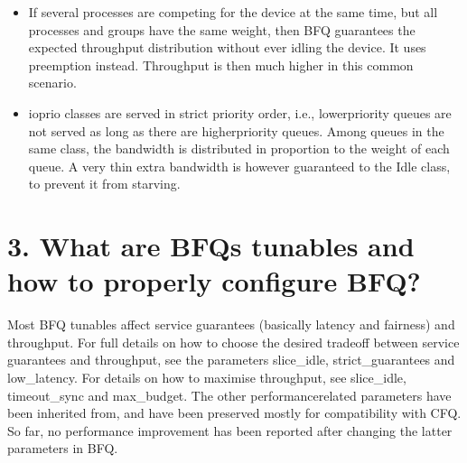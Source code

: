 \documentclass[a4paper,11pt,english]{sphinxmanual}
\begin{document}
\begin{itemize}
\begin{itemize}
\begin{itemize}
\begin{itemize}
\item {} 
Let small budgets be eventually assigned to the queues
associated with time\sphinxhyphen{}sensitive applications (which typically
perform sporadic and short I/O), because, the smaller the
budget assigned to a queue waiting for service is, the sooner
B\sphinxhyphen{}WF2Q+ will serve that queue (Subsec 3.3 in {[}2{]}).

\end{itemize}

\end{itemize}

\end{itemize}

\item {} 
If several processes are competing for the device at the same time,
but all processes and groups have the same weight, then BFQ
guarantees the expected throughput distribution without ever idling
the device. It uses preemption instead. Throughput is then much
higher in this common scenario.

\item {} 
ioprio classes are served in strict priority order, i.e.,
lower\sphinxhyphen{}priority queues are not served as long as there are
higher\sphinxhyphen{}priority queues.  Among queues in the same class, the
bandwidth is distributed in proportion to the weight of each
queue. A very thin extra bandwidth is however guaranteed to
the Idle class, to prevent it from starving.

\end{itemize}


\section{3. What are BFQ\textquotesingle{}s tunables and how to properly configure BFQ?}
\label{\detokenize{bfq-iosched:what-are-bfq-s-tunables-and-how-to-properly-configure-bfq}}
Most BFQ tunables affect service guarantees (basically latency and
fairness) and throughput. For full details on how to choose the
desired tradeoff between service guarantees and throughput, see the
parameters slice\_idle, strict\_guarantees and low\_latency. For details
on how to maximise throughput, see slice\_idle, timeout\_sync and
max\_budget. The other performance\sphinxhyphen{}related parameters have been
inherited from, and have been preserved mostly for compatibility with
CFQ. So far, no performance improvement has been reported after
changing the latter parameters in BFQ.
\end{document}
